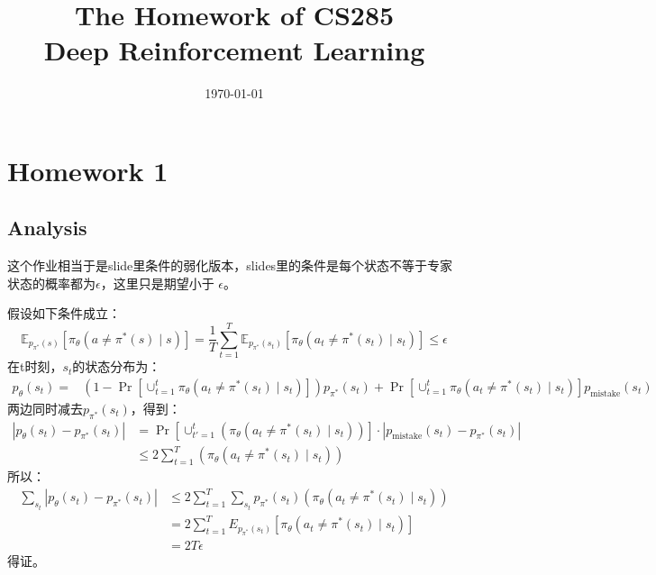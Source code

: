\documentclass[12pt,oneside]{book}
\title{The Homework of CS285\\
\large Deep Reinforcement Learning}
\author{\Name}
\date{\today}
\begin{document}
\sloppy
\maketitle
{}
\tableofcontents
\setcounter{tocdepth}{2}
\mainmatter
\newpage
{}

\chapter{Homework 1}

\section{Analysis}

这个作业相当于是slide里条件的弱化版本，slides里的条件是每个状态不等于专家状态的概率都为$\epsilon$，这里只是期望小于
$\epsilon$。

假设如下条件成立：
\begin{equation}
    \mathbb{E}_{p_{\pi^*}(s)} \left[\pi_{\theta}(a \ne \pi^*(s) \mid s)\right] 
    = \frac{1}{T} \sum_{t=1}^{T} \mathbb{E}_{p_{\pi^*}(s_t)} \left[\pi_{\theta}(a_t \ne \pi^*(s_t) \mid s_t)\right]
    \leq \epsilon
\end{equation}
在t时刻，$s_t$的状态分布为：
\begin{align}
    p_{\theta}(s_t) = 
    &(1 - \Pr[\cup_{t=1}^{t}\pi_{\theta}(a_t \ne \pi^*(s_t) \mid s_t)]) p_{\pi^*}(s_t) + 
    \Pr[\cup_{t=1}^{t}\pi_{\theta}(a_t \ne \pi^*(s_t) \mid s_t)] p_{\text{mistake}}(s_t)
\end{align}
两边同时减去$ p_{\pi^*}(s_t)$，得到：
\begin{align}
    |p_{\theta}(s_t) - p_{\pi^*}(s_t)| 
    &= \Pr\left[\cup_{t'=1}^{t} \left(\pi_{\theta}(a_{t} \ne \pi^*(s_{t}) \mid s_{t})\right)\right] \cdot |p_{\text{mistake}}(s_t) - p_{\pi^*}(s_t)| \nonumber \\
    &\leq 2\sum_{t=1}^{T}(\pi_{\theta}(a_{t} \ne \pi^*(s_{t}) \mid s_{t}))
\end{align}
所以：
\begin{align}
    \sum_{s_t}|p_{\theta}(s_t) - p_{\pi^*}(s_t)| 
    &\leq 2\sum_{t=1}^{T}\sum_{s_t}p_{\pi^*}(s_t)(\pi_{\theta}(a_{t} \ne \pi^*(s_{t}) \mid s_{t})) \nonumber \\
    &= 2\sum_{t=1}^{T}E_{p_{\pi^*}(s_t)}[\pi_{\theta}(a_{t} \ne \pi^*(s_{t}) \mid s_{t})] \nonumber \\
    &= 2T\epsilon
\end{align}
得证。
\end{document}
